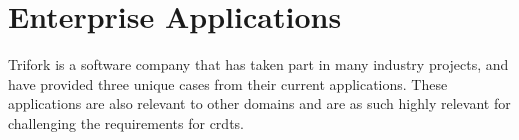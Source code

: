 \section{Enterprise Applications}
Trifork is a software company that has taken part in many industry projects, and have provided three unique cases from their current applications. These applications are also relevant to other domains and are as such highly relevant for challenging the requirements for \glspl{crdt}. 


\ifnum{}
	\newpage
\fi


\ifnum{}
	\newpage
\fi


\ifnum{}
	\newpage
\fi

